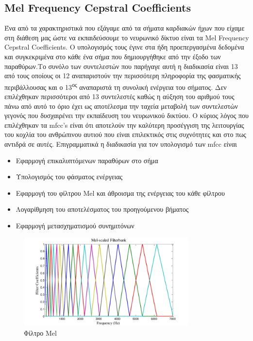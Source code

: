 \subsection{Mel Frequency Cepstral Coefficients}
Ένα από τα χαρακτηριστικά που εξάγαμε από τα σήματα καρδιακών ήχων που είχαμε
στη διάθεση μας ώστε να εκπαιδεύσουμε το νευρωνικό δίκτυο είναι τα Mel Frequency
Cepstral Coefficients. Ο υπολογισμός τους έγινε στα ήδη προεπεργασμένα δεδομένα
και συγκεκριμένα στο κάθε ένα σήμα που δημιουργήθηκε από την έξοδο των
παραθύρων.Το συνόλο των συντελεστών που παρήγαγε αυτή η διαδικασία είναι 13 από
τους οποίους οι 12 αναπαριστούν την περισσότερη πληροφορία της φασματικής
περιβάλλουσας και ο 13\textsuperscript{ος} αναπαριστά τη συνολική ενέργεια του
σήματος. Δεν επιλέχθηκαν περισσότεροι από 13 συντελεστές καθώς η αύξηση του
αριθμού τους πάνω από αυτό το όριο έχει ως αποτέλεσμα την ταχεία μεταβολή των
συντελεστών γεγονός που δυσχαιρένει την εκπαίδευση του νευρωνικού δικτύου. Ο
κύριος λόγος που επιλέχθηκαν τα mfcc's είναι ότι αποτελούν την καλύτερη
προσέγγιση της λειτουργίας του κοχλία του ανθρώπινου αυτιού που είναι
επιλεκτικός στις συχνότητες και στο πως αντιδρά σε αυτές. Επιγραμματικά η
διαδικασία για τον υπολογισμό των mfcc είναι \cite{mfcc}

\begin{itemize}
	\item Εφαρμογή επικαλυπτόμενων παραθύρων στο σήμα
	\item Υπολογισμός του φάσματος ενέργειας
	\item Εφαρμογή του φίλτρου Mel και άθροισμα της ενέργειας του κάθε φίλτρου
	\item Λογαρίθμηση του αποτελέσματος του προηγούμενου βήματος
	\item Εφαρμογή μετασχηματισμού συνημιτόνων
\end{itemize}

\begin{figure}[H]
	\center
	\includegraphics[width=0.8\textwidth]{images/MelFilter.png}
	\caption{Φίλτρο Mel}
	\label{melfilter}
\end{figure}


